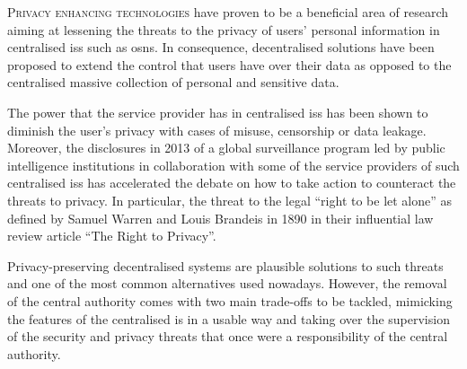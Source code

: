 


    {
    \lettrine{\textcolor[gray]{.25}{P}}{rivacy enhancing technologies}\csname@restorepar\endcsname\everypar{} 
    have proven to be a beneficial area of research aiming at lessening the threats 
    to the privacy of users' personal information in centralised \aclp*{is} such 
    as \aclp*{osn}. In consequence, decentralised solutions have been proposed to 
    extend the control that users have over their data as opposed to the centralised 
    massive collection of personal and sensitive data.\par
    }
    
    The power that the service provider has in centralised \aclp*{is} has been shown 
    to diminish the user's privacy with cases of misuse, censorship or data leakage. 
    Moreover, the disclosures in 2013 of a global surveillance program led by public 
    intelligence institutions in collaboration with some of the service providers 
    of such centralised \aclp*{is} has accelerated the debate on how to take action 
    to counteract the threats to privacy. In particular, the threat to the legal 
    ``right to be let alone'' as defined by Samuel Warren and Louis Brandeis in 
    1890 in their influential law review article ``The Right to Privacy''.
    
    Privacy-preserving decentralised systems are plausible solutions to such threats 
    and one of the most common alternatives used nowadays. However, the removal 
    of the central authority comes with two main trade-offs to be tackled, mimicking 
    the features of the centralised \acl*{is} in a usable way and taking over the 
    supervision of the security and privacy threats that once were a responsibility 
    of the central authority.
    

